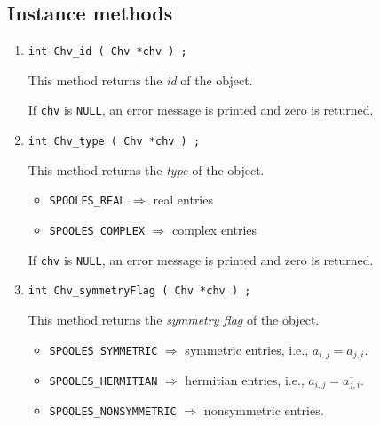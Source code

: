 \subsection{Instance methods}
\label{subsection:Chv:proto:instance}
\par
\begin{enumerate}
\item
\begin{verbatim}
int Chv_id ( Chv *chv ) ;
\end{verbatim}
This method returns the {\it id} of the object.
\par {}
If {\tt chv} is {\tt NULL},
an error message is printed and zero is returned.
\item
\begin{verbatim}
int Chv_type ( Chv *chv ) ;
\end{verbatim}
This method returns the {\it type} of the object.
\begin{itemize}
\item
{\tt SPOOLES\_REAL} $\Longrightarrow$ real entries
\item
{\tt SPOOLES\_COMPLEX} $\Longrightarrow$ complex entries
\end{itemize}
\par {}
If {\tt chv} is {\tt NULL},
an error message is printed and zero is returned.
\item
\begin{verbatim}
int Chv_symmetryFlag ( Chv *chv ) ;
\end{verbatim}
This method returns the {\it symmetry flag} of the object.
\begin{itemize}
\item
{\tt SPOOLES\_SYMMETRIC} $\Longrightarrow$ 
symmetric entries, i.e., $a_{i,j} = a_{j,i}$.
\item
{\tt SPOOLES\_HERMITIAN} $\Longrightarrow$ 
hermitian entries, i.e., $a_{i,j} = \overline{a_{j,i}}$.
\item
{\tt SPOOLES\_NONSYMMETRIC} $\Longrightarrow$ 
nonsymmetric entries.
\end{itemize}
\par {}

\end{enumerate}
